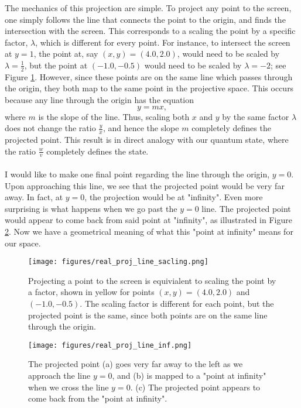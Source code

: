 The mechanics of this projection are simple. To project any point to the screen, one simply follows the line that connects the point to the origin, and finds the intersection with the screen.
This corresponds to a scaling the point by a specific factor, $\lambda$, which is different for every point. For instance, to intersect the screen at $y=1$, the point at, say $(x,y) = (4.0, 2.0)$, would need to be scaled by $\lambda = \frac{1}{2}$, but the point at $(-1.0, -0.5)$ would need to be scaled by $\lambda = -2$; see Figure \ref{fig:real_projective_line_scaling}. However, since these points are on the same line which passes through the origin, they both map to the same point in the projective space. This occurs because any line through the origin has the equation
\begin{equation} \label{eq:line_through_origin}
    y = m x,
\end{equation}
where $m$ is the slope of the line. Thus, scaling both $x$ and $y$ by the same factor $\lambda$ does not change the ratio $\frac{y}{x}$, and hence the slope $m$ completely defines the projected point. This result is in direct analogy with our quantum state, where the ratio $\frac{w}{v}$ completely defines the state. 
\\ \\
I would like to make one final point regarding the line through the origin, $y=0$. Upon approaching this line, we see that the projected point would be very far away. In fact, at $y=0$, the projection would be at "infinity". Even more surprising is what happens when we go past the $y=0$ line. The projected point would appear to come back from said point at "infinity", as illustrated in Figure \ref{fig:real_projective_line_inf}. Now we have a geometrical meaning of what this "point at infinity" means for our space.

\begin{figure}[H]
   \centering
   \texttt{[image: figures/real\_proj\_line\_sacling.png]}
   \caption{Projecting a point to the screen is equivialent to scaling the point by a factor, shown in yellow for points $(x,y) = (4.0, 2.0)$ and $(-1.0, -0.5)$. The scaling factor is different for each point, but the projected point is the same, since both points are on the same line through the origin.}
   \label{fig:real_projective_line_scaling}
\end{figure}

\begin{figure}[H]
    \centering
    \texttt{[image: figures/real\_proj\_line\_inf.png]}
    \caption{The projected point (a) goes very far away to the left as we approach the line $y=0$, and (b) is mapped to a "point at infinity" when we cross the line $y=0$. (c) The projected point appears to come back from the "point at infinity".}
    \label{fig:real_projective_line_inf}
\end{figure}

